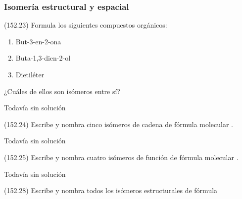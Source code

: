 \documentclass[10pt,a5paper,twoside]{article}
\begin{document}
  \subsubsection*{Isomería estructural y espacial}

  \begin{exercise}[
      tags    = {},
      topics  = {química, química orgánica, orgánica},
      source  = {FQ 1B MGH 2016, p152, e23},
    ]
    (152.23) Formula los siguientes compuestos orgánicos:
    \begin{enumerate}
      \item But-3-en-2-ona
      \item Buta-1,3-dien-2-ol
      \item Dietiléter
    \end{enumerate}
    ¿Cuáles de ellos son isómeros entre sí?
  \end{exercise}

  \begin{solution}[print=false]
    Todavía sin solución
  \end{solution}




  \begin{exercise}[
      tags    = {},
      topics  = {química, química orgánica, orgánica},
      source  = {FQ 1B MGH 2016, p152, e24},
    ]
    (152.24) Escribe y nombra cinco isómeros de cadena de fórmula molecular .
  \end{exercise}

  \begin{solution}[print=false]
    Todavía sin solución
  \end{solution}




  \begin{exercise}[
      tags    = {},
      topics  = {química, química orgánica, orgánica},
      source  = {FQ 1B MGH 2016, p152, e25},
    ]
    (152.25) Escribe y nombra cuatro isómeros de función de fórmula molecular .
  \end{exercise}

  \begin{solution}[print=false]
    Todavía sin solución
  \end{solution}




  \begin{exercise}[
      tags    = {},
      topics  = {química, química orgánica, orgánica},
      source  = {FQ 1B MGH 2016, p152, e28},
    ]
    (152.28) Escribe y nombra todos los isómeros estructurales de fórmula 
  \end{exercise}
\end{document}
